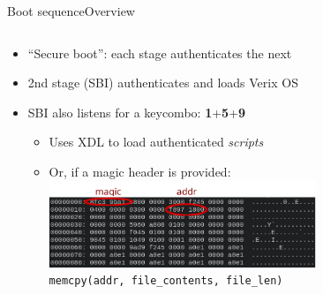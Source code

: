 \documentclass[12pt,aspectratio=169]{beamer}
\begin{document}
\begin{frame}{Boot sequence}{Overview}
\begin{columns}
	\begin{column}{\textwidth}
		\begin{itemize}
			\item ``Secure boot'': each stage authenticates the next
			\item 2nd stage (SBI) authenticates and loads Verix OS
			\item SBI also listens for a keycombo: \textbf{1}+\textbf{5}+\textbf{9}
			\begin{itemize}
				\item Uses XDL to load authenticated \emph{scripts}
				\item Or, if a magic header is provided: \\
				\includegraphics[width=8cm]{media/sbi_magic.png} \\
				\texttt{memcpy(addr, file\_contents, file\_len)}
			\end{itemize}

		\end{itemize}
	\end{column}
\end{columns}
\end{frame}



\end{document}
